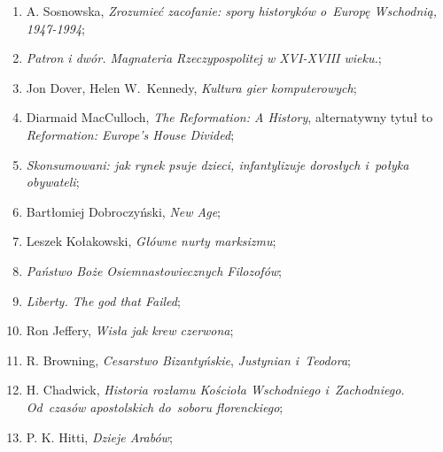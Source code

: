 \documentclass[a4paper,11pt]{article}
\begin{document}
\begin{enumerate}
\item A. Sosnowska, \textit{Zrozumieć zacofanie: spory historyków
    o~Europę Wschodnią, 1947-1994};



\item \textit{Patron i dwór. Magnateria Rzeczypospolitej w XVI-XVIII
    wieku.};



\item Jon Dover, Helen W.~Kennedy, \textit{Kultura gier komputerowych};



\item Diarmaid MacCulloch, \textit{The Reformation: A History},
  alternatywny tytuł to \textit{Reformation: Europe's House Divided};



\item \textit{Skonsumowani: jak rynek psuje dzieci, infantylizuje
    dorosłych i~połyka obywateli};



\item Bartłomiej Dobroczyński, \textit{New Age};



\item Leszek Kołakowski, \textit{Główne nurty marksizmu};



\item \textit{Państwo Boże Osiemnastowiecznych Filozofów};



\item \textit{Liberty. The god that Failed};



\item Ron Jeffery, \textit{Wisła jak krew czerwona};



\item R. Browning, \textit{Cesarstwo Bizantyńskie}, \textit{Justynian
    i~Teodora};



\item H. Chadwick, \textit{Historia rozłamu Kościoła Wschodniego
    i~Zachodniego. Od~czasów apostolskich do~soboru florenckiego};



\item P. K. Hitti, \textit{Dzieje Arabów};




\end{enumerate}
\end{document}
